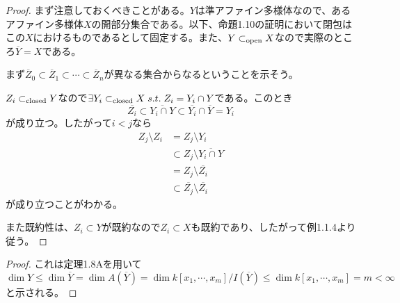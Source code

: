 \begin{proof}
  まず注意しておくべきことがある。$Y$は準アファイン多様体なので、あるアファイン多様体$X$の開部分集合である。以下、命題1.10の証明において閉包はこの$X$におけるものであるとして固定する。また、$Y \subset_{\text{open}} X$なので実際のところ$\overline{Y} = X$である。

まず$\overline{Z}_0 \subset \overline{Z}_1 \subset \cdots \subset \overline{Z}_n$が異なる集合からなるということを示そう。

$Z_i \subset_{\text{closed}} Y$なので$\exists Y_i \subset_{\text{closed}} X \; s.t. \; Z_i = Y_i \cap Y$である。このとき
\[
\overline{Z_i} \subset \overline{Y_i \cap Y} \subset \overline{Y_i} \cap \overline{Y} = Y_i
\]
が成り立つ。したがって$i < j$なら
\begin{align*}
Z_j \setminus Z_i &= Z_j \setminus Y_i \\
&\subset Z_j \setminus \overline{Y_i \cap Y} \\
&= Z_j \setminus \overline{Z_i} \\
&\subset \overline{Z_j} \setminus \overline{Z_i}
\end{align*}
が成り立つことがわかる。

また既約性は、$Z_i \subset Y$が既約なので$Z_i \subset X$も既約であり、したがって例1.1.4より従う。
\end{proof}


\begin{proof}
  これは定理1.8Aを用いて
  \[
  \dim Y \leq \dim \overline{Y} = \dim A(\overline{Y}) = \dim k[x_1, \cdots ,x_m] / I(\overline{Y}) \leq \dim k[x_1, \cdots ,x_m] = m < \infty
  \]
  と示される。
\end{proof}


